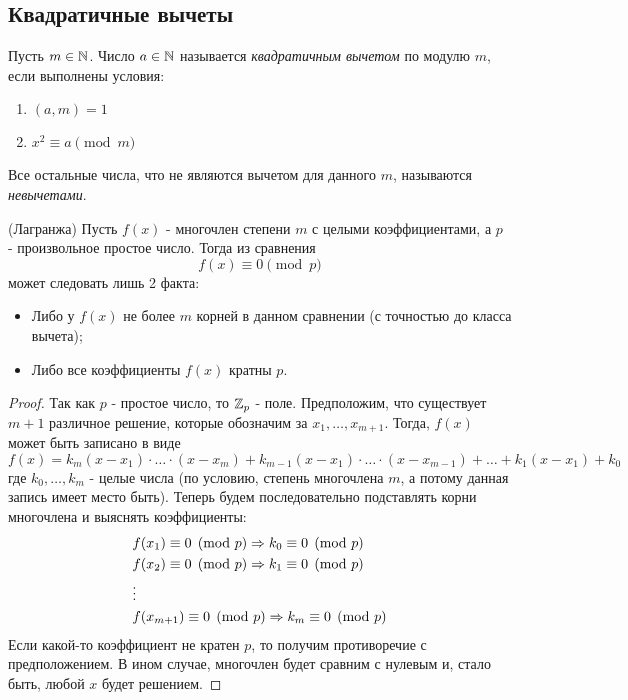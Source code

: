 \subsection{Квадратичные вычеты}

\begin{definition}
	Пусть $m \in \mathbb{N}$. Число $a \in \mathbb{N}$ называется \textit{квадратичным вычетом} по модулю $m$, если выполнены условия:
	\begin{enumerate}
		\item $(a, m) = 1$
		
		\item $x^2 \equiv a \pmod m$
	\end{enumerate}
\end{definition}

\begin{note}
	Все остальные числа, что не являются вычетом для данного $m$, называются \textit{невычетами}.
\end{note}

\begin{theorem} (Лагранжа)
	Пусть $f(x)$ - многочлен степени $m$ с целыми коэффициентами, а $p$ - произвольное простое число. Тогда из сравнения
	\[
		f(x) \equiv 0 \pmod p
	\]
	может следовать лишь 2 факта:
	\begin{itemize}
		\item Либо у $f(x)$ не более $m$ корней в данном сравнении (с точностью до класса вычета);
		
		\item Либо все коэффициенты $f(x)$ кратны $p$.
	\end{itemize}
\end{theorem}

\begin{proof}
	Так как $p$ - простое число, то $\mathbb{Z}_p$ - поле. Предположим, что существует $m + 1$ различное решение, которые обозначим за $x_1, \ldots, x_{m + 1}$. Тогда, $f(x)$ может быть записано в виде
	\[
		f(x) = k_m (x - x_1) \cdot \ldots \cdot (x - x_m) + k_{m - 1} (x - x_1) \cdot \ldots \cdot (x - x_{m - 1}) + \ldots + k_1 (x - x_1) + k_0
	\]
	где $k_0, \ldots, k_m$ - целые числа (по условию, степень многочлена $m$, а потому данная запись имеет место быть). Теперь будем последовательно подставлять корни многочлена и выяснять коэффициенты:
	\begin{align*}
		&{{f(x_1) \equiv 0 \pmod p} \Rightarrow k_0 \equiv 0 \pmod p}
		\\
		&{{f(x_2) \equiv 0 \pmod p} \Rightarrow k_1 \equiv 0 \pmod p}
		\\
		&\vdots
		\\
		&{{f(x_{m + 1}) \equiv 0 \pmod p} \Rightarrow k_m \equiv 0 \pmod p}
	\end{align*}
	Если какой-то коэффициент не кратен $p$, то получим противоречие с предположением. В ином случае, многочлен будет сравним с нулевым и, стало быть, любой $x$ будет решением.
\end{proof}


